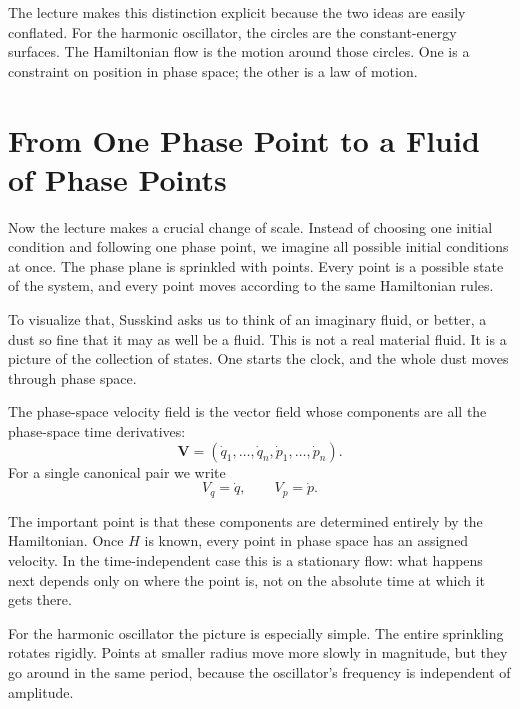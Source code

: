The lecture makes this distinction explicit because the two ideas are easily conflated. For the harmonic oscillator, the circles are the constant-energy surfaces. The Hamiltonian flow is the motion around those circles. One is a constraint on position in phase space; the other is a law of motion.

\section{From One Phase Point to a Fluid of Phase Points}

Now the lecture makes a crucial change of scale. Instead of choosing one initial condition and following one phase point, we imagine all possible initial conditions at once. The phase plane is sprinkled with points. Every point is a possible state of the system, and every point moves according to the same Hamiltonian rules.

To visualize that, Susskind asks us to think of an imaginary fluid, or better, a dust so fine that it may as well be a fluid. This is not a real material fluid. It is a picture of the collection of states. One starts the clock, and the whole dust moves through phase space.

\begin{definition}
The phase-space velocity field is the vector field whose components are all the phase-space time derivatives:
\begin{equation}
\mathbf V
=
(\dot q_1,\dots,\dot q_n,\dot p_1,\dots,\dot p_n).
\end{equation}
For a single canonical pair we write
\begin{equation}
V_q=\dot q, \qquad V_p=\dot p.
\end{equation}
\end{definition}

The important point is that these components are determined entirely by the Hamiltonian. Once \(H\) is known, every point in phase space has an assigned velocity. In the time-independent case this is a stationary flow: what happens next depends only on where the point is, not on the absolute time at which it gets there.

For the harmonic oscillator the picture is especially simple. The entire sprinkling rotates rigidly. Points at smaller radius move more slowly in magnitude, but they go around in the same period, because the oscillator's frequency is independent of amplitude.

